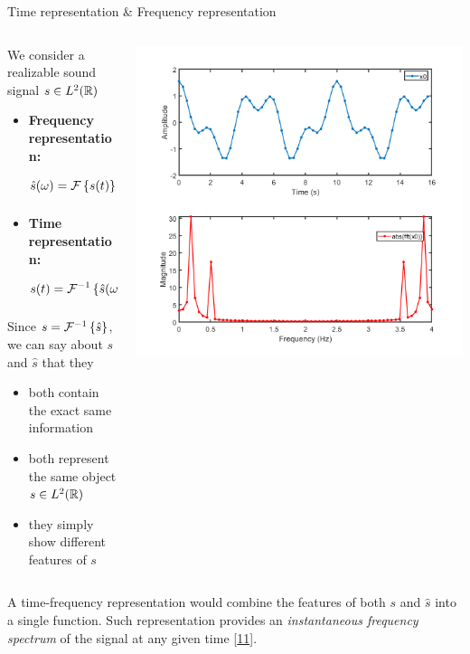 \documentclass[10pt,american,ignorenonframetext,aspectratio=1610]{beamer}
\providecommand{\tightlist}{%
  \setlength{\itemsep}{0pt}\setlength{\parskip}{0pt}}
\theoremstyle{remark}
\begin{document}
\begin{frame}{Time representation \& Frequency representation}
\protect\hypertarget{time-representation-frequency-representation}{}

\begin{columns}[T]
\begin{column}{0.6\textwidth}
We consider a realizable sound signal \(s\in L^2(\mathbb{R})\)

\begin{itemize}
\tightlist
\item
  \textbf{Frequency representation:}
  \[\hat s(\omega) = \mathcal{F}\left\{s(t)\right\}(\omega) = \int_{\mathbb{R}} s(t) e^{-2\pi i\omega t}\mathrm{d}t\]
\item
  \textbf{Time representation:}
  \[s(t) = \mathcal{F}^{-1}\left\{\hat s(\omega)\right\}(t) = \int_{\mathbb{R}} \hat s(\omega) e^{2\pi i\omega t}\mathrm{d}\omega\]
\end{itemize}

Since \(s=\mathcal{F}^{-1}\left\{\hat s\right\}\), we can say about \(s\) and \(\hat s\)
that they

\begin{itemize}
\tightlist
\item
  both contain the exact same information
\item
  both represent the same object \(s\in L^2(\mathbb{R})\)
\item
  they simply show different features of \(s\)
\end{itemize}
\end{column}

\begin{column}{0.4\textwidth}
\centering

\includegraphics{img/signal_vs_spectrum.png}
\end{column}
\end{columns}

A time-frequency representation would combine the features of both \(s\)
and \(\hat s\) into a single function. Such representation provides an
\emph{instantaneous frequency spectrum} of the signal at any given time
{[}\protect\hyperlink{ref-grochenig2001}{11}{]}.

\end{frame}
\end{document}
